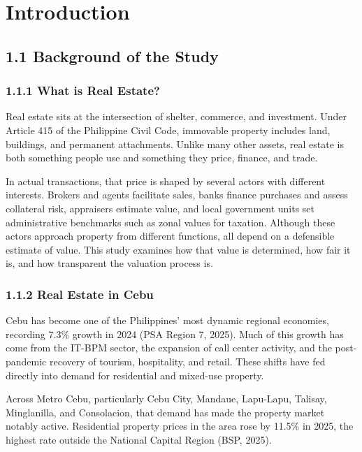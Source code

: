 \section{Introduction}\label{introduction}

\subsection{\texorpdfstring{\textbf{1.1 Background of the Study}}{1.1 Background of the Study}}\label{background-of-the-study}

\subsubsection{\texorpdfstring{\textbf{1.1.1 What is Real Estate?}}{1.1.1 What is Real Estate?}}\label{what-is-real-estate}

Real estate sits at the intersection of shelter, commerce, and investment. Under Article 415 of the Philippine Civil Code, immovable property includes land, buildings, and permanent attachments. Unlike many other assets, real estate is both something people use and something they price, finance, and trade.

In actual transactions, that price is shaped by several actors with different interests. Brokers and agents facilitate sales, banks finance purchases and assess collateral risk, appraisers estimate value, and local government units set administrative benchmarks such as zonal values for taxation. Although these actors approach property from different functions, all depend on a defensible estimate of value. This study examines how that value is determined, how fair it is, and how transparent the valuation process is.

\subsubsection{\texorpdfstring{\textbf{1.1.2 Real Estate in Cebu}}{1.1.2 Real Estate in Cebu}}\label{real-estate-in-cebu}

Cebu has become one of the Philippines' most dynamic regional economies, recording 7.3\% growth in 2024 (PSA Region 7, 2025). Much of this growth has come from the IT-BPM sector, the expansion of call center activity, and the post-pandemic recovery of tourism, hospitality, and retail. These shifts have fed directly into demand for residential and mixed-use property.

Across Metro Cebu, particularly Cebu City, Mandaue, Lapu-Lapu, Talisay, Minglanilla, and Consolacion, that demand has made the property market notably active. Residential property prices in the area rose by 11.5\% in 2025, the highest rate outside the National Capital Region (BSP, 2025).

